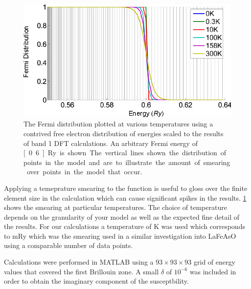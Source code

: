 \begin{figure}[htbp]
    \begin{center}
        \includegraphics[scale=0.9]{Chapter3-dHvABaFe2P2/Figures/AngleDepMeasurements/SusceptibilityTempSmearing/SusceptibilityTempSmearing}
        \caption{The Fermi distribution plotted at various temperatures using a contrived free electron distribution of energies scaled to the results of band 1 DFT calculations. An arbitrary Fermi energy of \unit[0.6]{Ry} is shown. The vertical lines shown the distribution of points in the model and are to illustrate the amount of smearing over points in the model that occur.}
        \label{Fig:3:SusceptibilityTempSmearing}
    \end{center}
\end{figure}

Applying a temeprature smearing to the function is useful to gloss over the finite element size in the calculation which can cause significant spikes in the results. \Fig\ref{Fig:3:SusceptibilityTempSmearing} shows the smearing at particular temperatures. The choice of temperature depends on the granularity of your model as well as the expected fine detail of the results. For our calculations a temperature of \unit[158]{K} was used which corresponds to \unit[1]{mRy} which was the smearing used in a similar investigation into LaFeAsO using a comparable number of data points\cite{Mazin2008}.

Calculations were performed in MATLAB using a $93\times93\times93$ grid of energy values that covered the first Brillouin zone. A small $\delta$ of $10^{-6}$ was included in order to obtain the imaginary component of the susceptbility.

